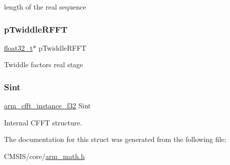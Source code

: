 length of the real sequence \mbox{\label{structarm__rfft__fast__instance__f32_a43370fe848d06993faf834da07ca91ce}} 
\subsubsection{\texorpdfstring{pTwiddleRFFT}{pTwiddleRFFT}}
{\footnotesize\ttfamily \mbox{\hyperlink{arm__math_8h_a4611b605e45ab401f02cab15c5e38715}{float32\+\_\+t}}$\ast$ p\+Twiddle\+R\+F\+FT}

Twiddle factors real stage \mbox{\label{structarm__rfft__fast__instance__f32_aa8a05a9fabc3852e5d476152a5067e53}} 
\subsubsection{\texorpdfstring{Sint}{Sint}}
{\footnotesize\ttfamily \mbox{\hyperlink{structarm__cfft__instance__f32}{arm\+\_\+cfft\+\_\+instance\+\_\+f32}} Sint}

Internal C\+F\+FT structure. 

The documentation for this struct was generated from the following file\+:\begin{DoxyCompactItemize}
\item 
C\+M\+S\+I\+S/core/\mbox{\hyperlink{arm__math_8h}{arm\+\_\+math.\+h}}\end{DoxyCompactItemize}
